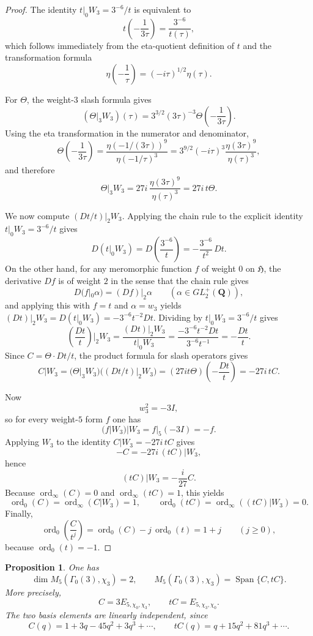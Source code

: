 \documentclass[11pt]{amsart}
\newtheorem{proposition}[theorem]{Proposition}
\theoremstyle{remark}
\DeclareMathOperator{\ord}{ord}
\DeclareMathOperator{\Span}{Span}
\newcommand{\Q}{\mathbf{Q}}
\begin{document}
\begin{proof}
The identity $t|_0W_3=3^{-6}/t$ is equivalent to
\[
t\!\left(-\frac{1}{3\tau}\right)=\frac{3^{-6}}{t(\tau)},
\]
which follows immediately from the eta-quotient definition of $t$ and the transformation formula
\[
\eta\!\left(-\frac1\tau\right)=(-i\tau)^{1/2}\eta(\tau).
\]

For $\Theta$, the weight-$3$ slash formula gives
\[
(\Theta|_3W_3)(\tau)
=
3^{3/2}(3\tau)^{-3}\Theta\!\left(-\frac{1}{3\tau}\right).
\]
Using the eta transformation in the numerator and denominator,
\[
\Theta\!\left(-\frac{1}{3\tau}\right)
=
\frac{\eta(-1/(3\tau))^9}{\eta(-1/\tau)^3}
=
3^{9/2}(-i\tau)^3\frac{\eta(3\tau)^9}{\eta(\tau)^3},
\]
and therefore
\[
\Theta|_3W_3
=
27i\,\frac{\eta(3\tau)^9}{\eta(\tau)^3}
=
27i\,t\Theta.
\]

We now compute $(Dt/t)|_2W_3$. Applying the chain rule to the explicit identity
$t|_0W_3=3^{-6}/t$ gives
\[
D(t|_0W_3)=D\!\left(\frac{3^{-6}}{t}\right)=-\frac{3^{-6}}{t^2}\,Dt.
\]
On the other hand, for any meromorphic function $f$ of weight $0$ on $\mathfrak H$, the
derivative $Df$ is of weight $2$ in the sense that the chain rule gives
\[
D(f|_0\alpha)=(Df)|_2\alpha
\qquad (\alpha\in GL_2^+(\Q)),
\]
and applying this with $f=t$ and $\alpha=w_3$ yields $(Dt)|_2W_3=D(t|_0W_3)=-3^{-6}t^{-2}Dt$.
Dividing by $t|_0W_3=3^{-6}/t$ gives
\[
\left(\frac{Dt}{t}\right)\!\Big|_2W_3
=
\frac{(Dt)|_2W_3}{t|_0W_3}
=
\frac{-3^{-6}t^{-2}Dt}{3^{-6}t^{-1}}
=
-\frac{Dt}{t}.
\]
Since $C=\Theta\cdot Dt/t$, the product formula for slash operators gives
\[
C|W_3
=
(\Theta|_3W_3)\bigl((Dt/t)|_2W_3\bigr)
=
(27it\Theta)\!\left(-\frac{Dt}{t}\right)
=
-27i\,tC.
\]

Now
\[
w_3^2=-3I,
\]
so for every weight-$5$ form $f$ one has
\[
(f|W_3)|W_3=f|_5(-3I)=-f.
\]
Applying $W_3$ to the identity $C|W_3=-27i\,tC$ gives
\[
-C=-27i\,(tC)|W_3,
\]
hence
\[
(tC)|W_3=-\frac{i}{27}C.
\]
Because $\ord_\infty(C)=0$ and $\ord_\infty(tC)=1$, this yields
\[
\ord_0(C)=\ord_\infty(C|W_3)=1,
\qquad
\ord_0(tC)=\ord_\infty((tC)|W_3)=0.
\]
Finally,
\[
\ord_0\!\left(\frac{C}{t^j}\right)=\ord_0(C)-j\,\ord_0(t)=1+j
\qquad (j\ge0),
\]
because $\ord_0(t)=-1$.
\end{proof}

\begin{proposition}\label{prop:weight5-basis}
One has
\[
\dim M_5(\Gamma_0(3),\chi_3)=2,
\qquad
M_5(\Gamma_0(3),\chi_3)=\Span\{C,tC\}.
\]
More precisely,
\[
C=3E_{5,\chi_0,\chi_3},
\qquad
tC=E_{5,\chi_3,\chi_0}.
\]
The two basis elements are linearly independent, since
\[
C(q)=1+3q-45q^2+3q^3+\cdots,
\qquad
tC(q)=q+15q^2+81q^3+\cdots.
\]
\end{proposition}
\end{document}
